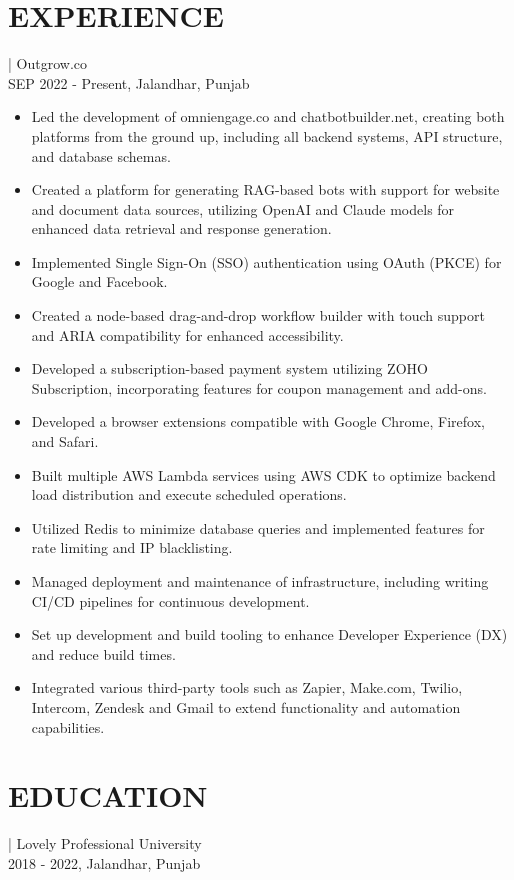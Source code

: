 \documentclass[]{resume}
\begin{document}
\section{EXPERIENCE}
 | \textrm{Outgrow.co}\\
SEP 2022 - Present, Jalandhar, Punjab
\begin{itemize}
  \item Led the development of omniengage.co and chatbotbuilder.net, creating both platforms from the ground up, including all backend systems, API structure, and database schemas.
  \item Created a platform for generating RAG-based bots with support for website and document data sources, utilizing OpenAI and Claude models for enhanced data retrieval and response generation.
  \item Implemented Single Sign-On (SSO) authentication using OAuth (PKCE) for Google and Facebook.
  \item Created a node-based drag-and-drop workflow builder with touch support and ARIA compatibility for enhanced accessibility.
  \item Developed a subscription-based payment system utilizing ZOHO Subscription, incorporating features for coupon management and add-ons.
  \item Developed a browser extensions compatible with Google Chrome, Firefox, and Safari.
  \item Built multiple AWS Lambda services using AWS CDK to optimize backend load distribution and execute scheduled operations.
  \item Utilized Redis to minimize database queries and implemented features for rate limiting and IP blacklisting.
  \item Managed deployment and maintenance of infrastructure, including writing CI/CD pipelines for continuous development.
  \item Set up development and build tooling to enhance Developer Experience (DX) and reduce build times.
  \item Integrated various third-party tools such as Zapier, Make.com, Twilio, Intercom, Zendesk and Gmail to extend functionality and automation capabilities.
\end{itemize}

\section{EDUCATION}
 | \textrm{Lovely Professional University}\\
2018 - 2022, Jalandhar, Punjab
\end{document}
